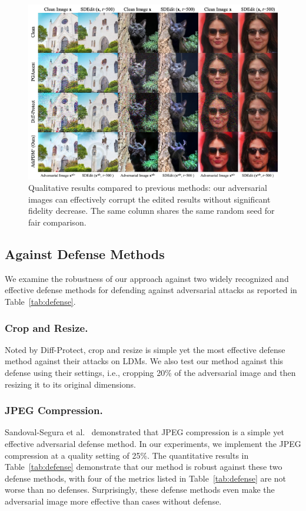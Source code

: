 
\begin{figure}[t]
\centering
\includegraphics[width=0.79\linewidth]{figures/qualitative_results.pdf}
\caption{Qualitative results compared to previous methods: our adversarial images can effectively corrupt the edited results without significant fidelity decrease. The same column shares the same random seed for fair comparison.
}
\label{qualitative}
\end{figure}



\subsection{Against Defense Methods}
We examine the robustness of our approach against two widely recognized and effective defense methods for defending against adversarial attacks as reported in Table~\ref{tab:defense}.

\subsubsection{Crop and Resize.}
Noted by Diff-Protect, crop and resize is simple yet the most effective defense method against their attacks on LDMs. We also test our method against this defense using their settings, i.e., cropping 20\% of the adversarial image and then resizing it to its original dimensions.


\subsubsection{JPEG Compression.}
Sandoval-Segura et al.~\cite{sandoval2023jpeg} demonstrated that JPEG compression is a simple yet effective adversarial defense method. In our experiments, we implement the JPEG compression at a quality setting of 25\%. The quantitative results in Table~\ref{tab:defense} demonstrate that our method is robust against these two defense methods, with four of the metrics listed in Table~\ref{tab:defense} are not worse than no defenses. Surprisingly, these defense methods even make the adversarial image more effective than cases without defense.


